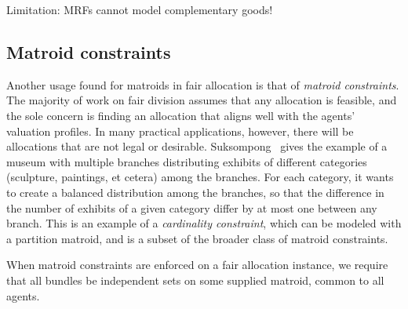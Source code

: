 Limitation: MRFs cannot model complementary goods!


\subsection{Matroid constraints}
Another usage found for matroids in fair allocation is that of \textit{matroid constraints}. The majority of work on fair division assumes that any allocation is feasible, and the sole concern is finding an allocation that aligns well with the agents' valuation profiles. In many practical applications, however, there will be allocations that are not legal or desirable. Suksompong~\cite{suksumpong-constraints} gives the example of a museum with multiple branches distributing exhibits of different categories (sculpture, paintings, et cetera) among the branches. For each category, it wants to create a balanced distribution among the branches, so that the difference in the number of exhibits of a given category differ by at most one between any branch. This is an example of a \textit{cardinality constraint}, which can be modeled with a partition matroid, and is a subset of the broader class of matroid constraints. 

When matroid constraints are enforced on a fair allocation instance, we require that all bundles be independent sets on some supplied matroid, common to all agents. 